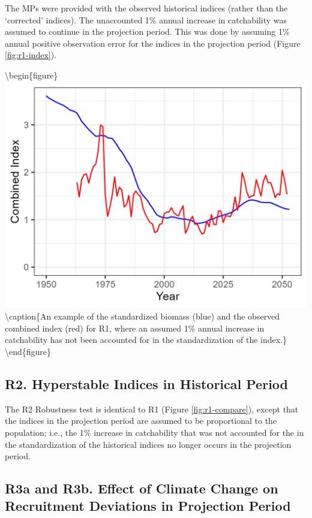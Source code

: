 \documentclass[
]{article}
\begin{document}
The MPs were provided with the observed historical indices (rather than the `corrected' indices). The unaccounted 1\% annual increase in catchability was assumed to continue in the projection period. This was done by assuming 1\% annual positive observation error for the indices in the projection period (Figure \ref{fig:r1-index}).

\textbackslash begin\{figure\}
\includegraphics[width=16.67in]{../../img/R1_Increasing_q/Index} \textbackslash caption\{An example of the standardized biomass (blue) and the observed combined index (red) for R1, where an assumed 1\% annual increase in catchability has not been accounted for in the standardization of the index.\}\label{fig:r1-index}
\textbackslash end\{figure\}

\hypertarget{r2.-hyperstable-indices-in-historical-period}{%
\subsection{R2. Hyperstable Indices in Historical Period}\label{r2.-hyperstable-indices-in-historical-period}}

The R2 Robustness test is identical to R1 (Figure \ref{fig:r1-compare}), except that the indices in the projection period are assumed to be proportional to the population; i.e., the 1\% increase in catchability that was not accounted for the in the standardization of the historical indices no longer occurs in the projection period.

\hypertarget{r3a-and-r3b.-effect-of-climate-change-on-recruitment-deviations-in-projection-period}{%
\subsection{R3a and R3b. Effect of Climate Change on Recruitment Deviations in Projection Period}\label{r3a-and-r3b.-effect-of-climate-change-on-recruitment-deviations-in-projection-period}}
\end{document}
